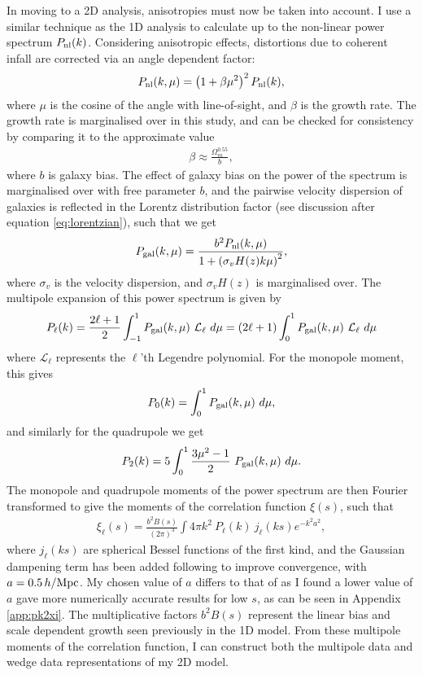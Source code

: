 \documentclass[titlesmallcaps, examinerscopy, copyrightpage]{uqthesis}
\begin{document}
In moving to a 2D analysis, anisotropies must now be taken into account. I use a similar technique as the 1D analysis to calculate up to the non-linear power spectrum $P_{\rm{nl}}(k)$. Considering anisotropic effects, distortions due to coherent infall are corrected via an angle dependent factor:
\begin{align}
P_{\rm{nl}}(k, \mu) = \left(1 + \beta \mu^2\right)^2 P_{\text{nl}}(k),
\end{align}
where $\mu$ is the cosine of the angle with line-of-sight, and $\beta$ is the growth rate. The growth rate is marginalised over in this study, and can be checked for consistency by comparing it to the approximate value
\begin{align}
\beta \approx \frac{\Omega_m^{0.55}}{b},
\end{align}
where $b$ is galaxy bias. The effect of galaxy bias on the power of the spectrum is marginalised over with free parameter $b$, and the pairwise velocity dispersion of galaxies is reflected in the Lorentz distribution factor (see discussion after equation \ref{eq:lorentzian}), such that we get
\begin{align}
P_{\rm{gal}}(k, \mu) = \frac{b^2 P_{\rm{nl}}(k, \mu)}{1 + \left(\sigma_v H(z) k \mu\right)^2},
\end{align} 
where $\sigma_v$ is the velocity dispersion, and $\sigma_v H(z)$ is marginalised over. The multipole expansion of this power spectrum is given by
\begin{align}
P_{\ell}(k) = \frac{2\ell + 1}{2} \int_{-1}^1 P_{\rm{gal}}(k, \mu) \ \mathcal{L}_\ell \  d\mu = (2\ell + 1) \int_{0}^1 P_{\rm{gal}}(k, \mu) \ \mathcal{L}_\ell \  d\mu
\end{align}
where $\mathcal{L}_\ell$ represents the $\ell$'th Legendre polynomial. For the monopole moment, this gives
\begin{align}
P_0(k) = \int_0^1 P_{\rm{gal}}(k, \mu) \  d\mu,
\end{align}
 and similarly for the quadrupole we get
\begin{align}
P_2(k) = 5 \int_0^1 \frac{3\mu^2 - 1}{2}\  P_{\rm{gal}}(k, \mu)\  d\mu.
\end{align}
The monopole and quadrupole moments of the power spectrum are then Fourier transformed to give the moments of the correlation function $\xi(s)$, such that
\begin{align}
\xi_\ell(s) = \frac{b^2 B(s)}{(2\pi)^3} \int 4\pi k^2 \ P_\ell(k) \ j_\ell(ks) e^{-k^2 a^2},
\end{align}
where $j_\ell(ks)$ are spherical Bessel functions of the first kind, and the Gaussian dampening term has been added following \citet{AndersonAubourg2012} to improve convergence, with $a= 0.5\, h/\rm{Mpc}$. My chosen value of $a$ differs to that of \citet{AndersonAubourg2012} as I found a lower value of $a$ gave more numerically accurate results for low $s$, as can be seen in Appendix \ref{app:pk2xi}. The multiplicative factors $b^2 B(s)$ represent the linear bias and scale dependent growth seen previously in the 1D model. From these multipole moments of the correlation function, I can construct both the multipole data and wedge data representations of my 2D model.
\end{document}
